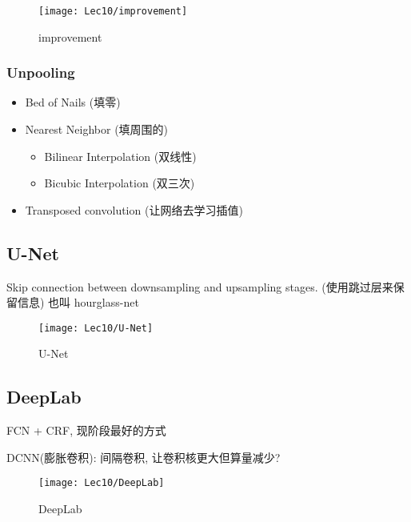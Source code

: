 \begin{figure}[H]
    \centering
    \texttt{[image: Lec10/improvement]}
    \caption{improvement}
\end{figure}

\subsubsection{Unpooling}
\begin{itemize}
    \item Bed of Nails (填零)
    \item Nearest Neighbor (填周围的)
    \begin{itemize}
        \item Bilinear Interpolation (双线性)
        \item Bicubic Interpolation (双三次)
    \end{itemize}
    \item Transposed convolution (让网络去学习插值)
\end{itemize}

\subsection{U-Net}
Skip connection between downsampling and upsampling stages. (使用跳过层来保留信息) 也叫 hourglass-net

\begin{figure}[H]
    \centering
    \texttt{[image: Lec10/U-Net]}
    \caption{U-Net}
\end{figure}

\subsection{DeepLab}
FCN + CRF, 现阶段最好的方式

DCNN(膨胀卷积): 间隔卷积, 让卷积核更大但算量减少? 

\begin{figure}[H]
    \centering
    \texttt{[image: Lec10/DeepLab]}
    \caption{DeepLab}
\end{figure}

